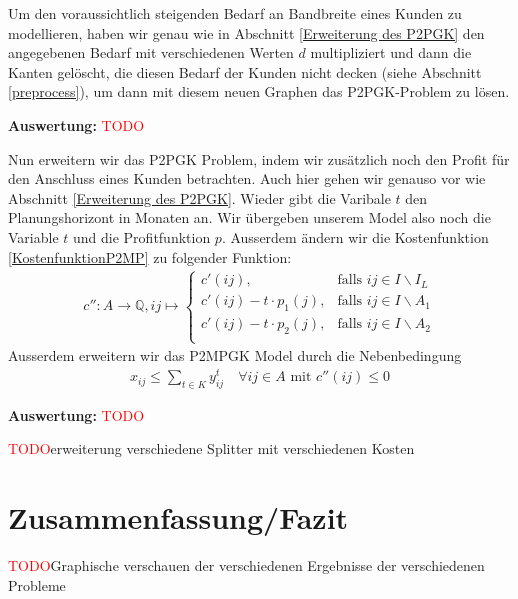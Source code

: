 \documentclass[11pt,a4paper]{article}
\newcommand{\Q}{\mathbb{Q}}
\newcommand{\TODO}{\textcolor{red}{TODO}}
\theoremstyle{my_th_style1}
\begin{document}
 Um den voraussichtlich steigenden Bedarf an Bandbreite eines Kunden zu modellieren, haben wir genau wie in Abschnitt \ref{Erweiterung des P2PGK} den angegebenen Bedarf mit verschiedenen Werten $d$ multipliziert und dann die Kanten gel\"oscht, die diesen Bedarf der Kunden nicht decken (siehe Abschnitt \ref{preprocess}), um dann mit diesem neuen Graphen das P2PGK-Problem zu l\"osen.
 
 \textbf{Auswertung:} \TODO
 
  
Nun erweitern wir das P2PGK Problem, indem wir zusätzlich noch den Profit für den Anschluss eines Kunden  betrachten.
 Auch hier gehen wir genauso vor wie Abschnitt \ref{Erweiterung des P2PGK}.  Wieder gibt die Varibale  $t$  den Planungshorizont in Monaten an. Wir \"ubergeben unserem Model also noch die Variable $t$ und die Profitfunktion $p$. Ausserdem \"andern wir die Kostenfunktion \eqref{KostenfunktionP2MP}  zu folgender Funktion:
 \begin{align*}
  c'': A  \rightarrow \Q,  ij  \mapsto \left\{\begin{array}{cl} 
 c'(ij), & \text{falls } ij \in I\backslash I_L \\ 
  c'(ij) -t  \cdot p_1(j), & \text{falls } ij \in I\backslash A_1 \\ 
    c'(ij) -t \cdot p_2(j), & \text{falls } ij \in I\backslash A_2 \\ 
\end{array}  \right.
 \end{align*}
 Ausserdem erweitern wir das P2MPGK Model durch die Nebenbedingung 
 \begin{align*}
 x_{ij} \leq \displaystyle\sum_{t \in K} y_{ij}^t \quad \forall ij \in A \text{ mit } c''(ij) \leq 0
 \end{align*}
 
 \textbf{Auswertung:} \TODO
 
 \TODO erweiterung verschiedene Splitter mit verschiedenen Kosten
 
 \section{Zusammenfassung/Fazit}
 \TODO Graphische verschauen der verschiedenen Ergebnisse der verschiedenen Probleme
 
 
\end{document}
